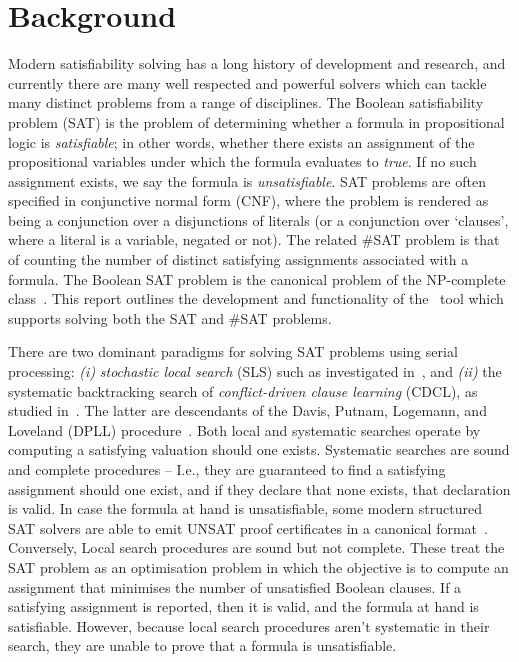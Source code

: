 \documentclass[
10pt, %
a4paper, %
oneside, %
headinclude,footinclude, %
BCOR5mm, %
]{scrartcl}
\begin{document}
\clearpage




\section{Background}\label{sec:background}

Modern satisfiability solving has a long history of development and research, and currently there are many well respected and powerful solvers which can tackle many distinct problems from a range of disciplines.
The Boolean satisfiability problem (SAT) is the problem of determining whether a formula in propositional logic is {\em satisfiable}; in other words, whether there exists an assignment of the propositional variables under which the formula evaluates to {\em true}.
If no such assignment exists, we say the formula is {\em unsatisfiable}.
SAT problems are often specified in conjunctive normal form (CNF), where the problem is rendered as being a conjunction over a disjunctions of literals (or a conjunction over `clauses', where a literal is a variable, negated or not).
The related $\#$SAT problem is that of counting the number of distinct satisfying assignments associated with a formula.
The Boolean SAT problem is the canonical problem of the NP-complete class~\cite{10.1145/800157.805047,Kar72}.
This report outlines the development and functionality of the \dagster\  tool which supports solving both the SAT and $\#$SAT problems. 

There are two dominant paradigms for solving SAT problems using serial processing: {\em (i)} {\em stochastic local search} (SLS) such as investigated in~\cite{pham:etal:2008,pham:etal:2007,balint:schoning:14}, and  {\em (ii)} the systematic backtracking search of {\em conflict-driven clause learning} (CDCL), as studied in~\cite{audemard:and:simon:2009,biere:2008}.
The latter are descendants of the Davis, Putnam, Logemann, and Loveland (DPLL) procedure~\cite{10.1145/368273.368557,10.1145/321033.321034}.
Both local and systematic searches operate by computing a satisfying valuation should one exists.
Systematic searches are sound and complete procedures -- I.e., they are guaranteed to find a satisfying assignment should one exist, and if they declare that none exists, that declaration is valid.
In case the formula at hand is unsatisfiable, some modern structured SAT solvers are able to emit UNSAT proof certificates in a canonical format~\cite{10.1007/978-3-319-09284-3_31}.
Conversely, Local search procedures are sound but not complete.
These treat the SAT problem as an optimisation problem in which the objective is to compute an assignment that minimises the number of unsatisfied Boolean clauses.
If a satisfying assignment is reported, then it is valid, and the formula at hand is satisfiable.
However, because local search procedures aren't systematic in their search, they are unable to prove that a formula is unsatisfiable.
\end{document}
